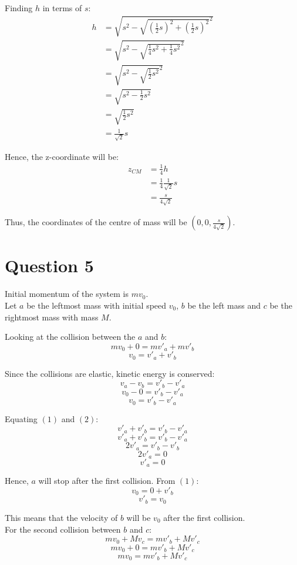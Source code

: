 \documentclass[11pt]{article}
\begin{document}
Finding \(h\) in terms of \(s\):
\begin{align*}
h &= \sqrt{s^2 - \sqrt{\left(\frac{1}{2}s \right)^2 + \left(\frac{1}{2}s \right)^2}^2} \\
&= \sqrt{s^2 - \sqrt{\frac{1}{4}s^2 + \frac{1}{4}s^2}^2} \\
&= \sqrt{s^2 - \sqrt{\frac{1}{2}s^2}^2} \\
&= \sqrt{s^2 - \frac{1}{2}s^2} \\
&= \sqrt{\frac{1}{2}s^2} \\
&= \frac{1}{\sqrt{2}}s
\end{align*}

Hence, the z-coordinate will be:
\begin{align*}
z_{CM} &= \frac{1}{4}h \\
&= \frac{1}{4} \frac{1}{\sqrt{2}}s \\
&= \frac{s}{4\sqrt{2}}
\end{align*}

Thus, the coordinates of the centre of mass will be \(\left(0, 0, \frac{s}{4\sqrt{2}}\right)\).

\newpage

\section{Question 5}
\label{sec:org00fbe88}
Initial momentum of the system is \(mv_0\).
\\[0pt]

Let \(a\) be the leftmost mass with initial speed \(v_0\), \(b\) be the left mass and \(c\) be the rightmost mass with mass \(M\).

Looking at the collision between the \(a\) and \(b\):
\[mv_0 + 0 = mv'_a + mv'_b\]
\[v_0 = v'_a + v'_b \tag{1}\]

Since the collisions are elastic, kinetic energy is conserved:
\[v_a - v_b = v'_b - v'_a\]
\[v_0 - 0 = v'_b - v'_a\]
\[v_0 = v'_b - v'_a \tag{2}\]

Equating \((1)\) and \((2)\):
\[v'_a + v'_b = v'_b - v'_a\]
\[v'_a + v'_b = v'_b - v'_a\]
\[2v'_a = v'_b - v'_b\]
\[2v'_a = 0\]
\[v'_a = 0\]

Hence, \(a\) will stop after the first collision. From \((1)\):
\[v_0 = 0 + v'_b\]
\[v'_b = v_0\]

This means that the velocity of \(b\) will be \(v_0\) after the first collision.
\\[0pt]

For the second collision between \(b\) and \(c\):
\[mv_0 + Mv_c = mv'_b + Mv'_c\]
\[mv_0 + 0 = mv'_b + Mv'_c\]
\[mv_0 = mv'_b + Mv'_c \tag{3}\]
\end{document}
